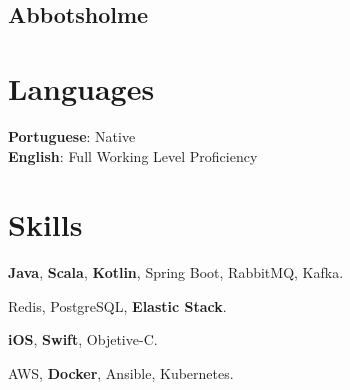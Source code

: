 \documentclass[letterpaper]{deedy-resume} %
\begin{document}
\begin{minipage}[t]{0.33\textwidth}
\sectionspace %

\subsection{Abbotsholme}

\sectionspace %


\section{Languages} 
\textbf{Portuguese}: Native\\
\textbf{English}: Full Working Level Proficiency\\
\sectionspace %


\section{Skills}

\textbf{Java}, \textbf{Scala}, \textbf{Kotlin}, Spring Boot, RabbitMQ, Kafka.

\vspace{2mm}
Redis, PostgreSQL, \textbf{Elastic Stack}.

\vspace{2mm}
\textbf{iOS}, \textbf{Swift}, Objetive-C.

\vspace{2mm}
AWS, \textbf{Docker}, Ansible, Kubernetes.


\sectionspace %

\end{minipage} %
\hfill
%
\end{document}
